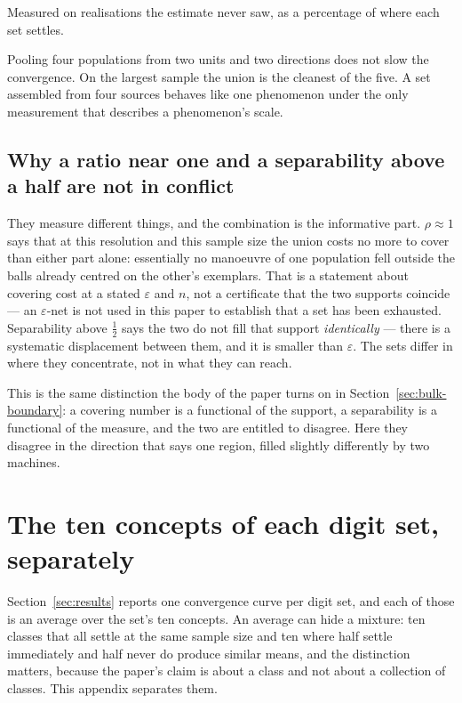 \documentclass[10pt]{article}
\theoremstyle{plain}
\theoremstyle{definition}
\theoremstyle{remark}
\begin{document}
Measured on realisations the estimate never saw, as a percentage of where each
set settles.

\begin{center}\small

\end{center}

Pooling four populations from two units and two directions does not slow the
convergence. On the largest sample the union is the cleanest of the five. A set
assembled from four sources behaves like one phenomenon under the only
measurement that describes a phenomenon's scale.

\subsection*{Why a ratio near one and a separability above a half are not in
conflict}

They measure different things, and the combination is the informative part.
$\rho \approx 1$ says that at this resolution and this sample size the union
costs no more to cover than either part alone: essentially no manoeuvre of one
population fell outside the balls already centred on the other's exemplars.
That is a statement about covering cost at a stated $\varepsilon$ and $n$, not a
certificate that the two supports coincide --- an $\varepsilon$-net is not used
in this paper to establish that a set has been exhausted. Separability above $\tfrac12$ says the two do not fill that support
\emph{identically} --- there is a systematic displacement between them, and it
is smaller than $\varepsilon$. The sets differ in where they concentrate, not
in what they can reach.

This is the same distinction the body of the paper turns on in
Section~\ref{sec:bulk-boundary}: a covering number is a functional of the
support, a separability is a functional of the measure, and the two are
entitled to disagree. Here they disagree in the direction that says one region,
filled slightly differently by two machines.

\section{The ten concepts of each digit set, separately}
\label{app:digits-per-class}

Section~\ref{sec:results} reports one convergence curve per digit set, and each
of those is an average over the set's ten concepts. An average can hide a
mixture: ten classes that all settle at the same sample size and ten where
half settle immediately and half never do produce similar means, and the
distinction matters, because the paper's claim is about a class and not about
a collection of classes. This appendix separates them.
\end{document}
